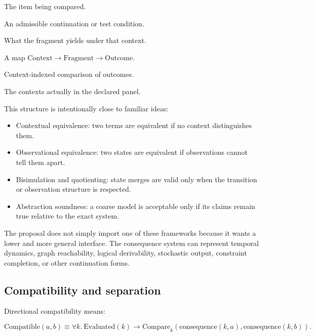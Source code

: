 \documentclass[11pt]{article}
\begin{document}
\begin{description}[leftmargin=*]
  \item[Fragment] The item being compared.
  \item[Context] An admissible continuation or test condition.
  \item[Outcome] What the fragment yields under that context.
  \item[consequence] A map \(\mathrm{Context} \to \mathrm{Fragment} \to
  \mathrm{Outcome}\).
  \item[Compare] Context-indexed comparison of outcomes.
  \item[Evaluated] The contexts actually in the declared panel.
\end{description}

This structure is intentionally close to familiar ideas:

\begin{itemize}[leftmargin=*]
  \item Contextual equivalence: two terms are equivalent if no context
  distinguishes them.

  \item Observational equivalence: two states are equivalent if observations
  cannot tell them apart.

  \item Bisimulation and quotienting: state merges are valid only when the
  transition or observation structure is respected.

  \item Abstraction soundness: a coarse model is acceptable only if its claims
  remain true relative to the exact system.
\end{itemize}

The proposal does not simply import one of these frameworks because it wants a
lower and more general interface. The consequence system can represent temporal
dynamics, graph reachability, logical derivability, stochastic output,
constraint completion, or other continuation forms.

\subsection{Compatibility and separation}

Directional compatibility means:

\[
\mathrm{Compatible}(a,b) \equiv
\forall k.\ \mathrm{Evaluated}(k) \to
\mathrm{Compare}_k(\mathrm{consequence}(k,a),\mathrm{consequence}(k,b)).
\]
\end{document}
